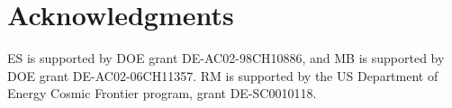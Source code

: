 \documentclass[iop, twocolappendix, appendixfloats, numberedappendix, apj]{hackemulateapj}
\begin{document}
\section*{Acknowledgments}

ES is supported by DOE grant DE-AC02-98CH10886, and MB is supported by DOE
grant DE-AC02-06CH11357.  RM is supported by the US Department of Energy Cosmic
Frontier program, grant DE-SC0010118.


%
%
%
%


\end{document}
